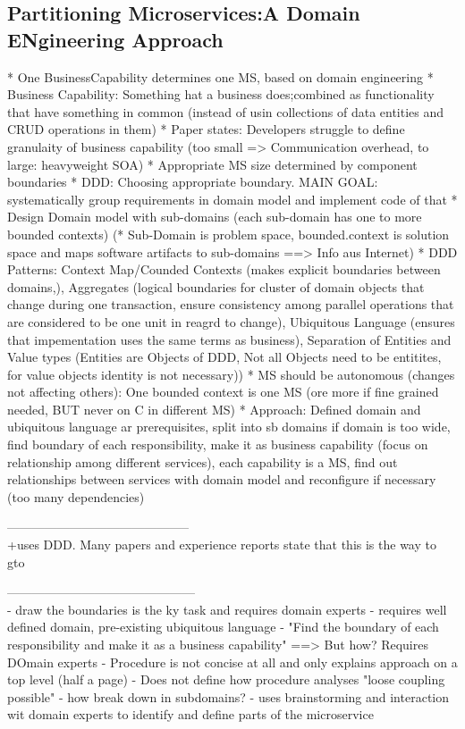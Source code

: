 \subsection{Partitioning Microservices:A Domain ENgineering Approach}

* One BusinessCapability determines one MS, based on domain engineering
* Business Capability: Something hat a business does;combined as functionality that have something in common (instead of usin collections of data entities and CRUD operations in them)
* Paper states: Developers struggle to define granulaity of business capability (too small => Communication overhead, to large: heavyweight SOA)
* Appropriate MS size determined by component boundaries
* DDD: Choosing appropriate boundary. MAIN GOAL: systematically group requirements in domain model and implement code  of that
* Design Domain model with sub-domains (each sub-domain has one to more bounded contexts)
(* Sub-Domain is problem space, bounded.context is solution space and maps software artifacts to sub-domains ==> Info aus Internet)
* DDD Patterns: Context Map/Counded Contexts (makes explicit boundaries between domains,), Aggregates (logical boundaries for cluster of domain objects that change during one transaction, ensure consistency among parallel operations that are considered to be one unit in reagrd to change), Ubiquitous Language (ensures that impementation uses the same terms as business), Separation of Entities and Value types (Entities are Objects of DDD, Not all Objects need to be entitites, for value objects identity is not necessary))
* MS should be autonomous (changes not affecting others): One bounded context is one MS (ore more if fine grained needed, BUT never on C in different MS)
* Approach: Defined domain and ubiquitous language ar prerequisites, split into sb domains if domain is too wide, find boundary of each responsibility, make it as business capability (focus on relationship among different services), each capability is a MS, find out relationships between services with domain model and reconfigure if necessary (too many dependencies)


--------------------------------------------\\


+uses DDD. Many papers and experience reports state that this is the way to gto


---------------------------------------------\\

- draw the boundaries is the ky task and requires domain experts
- requires well defined domain, pre-existing ubiquitous language
- "Find the boundary of each responsibility and make it as a business capability" ==> But how? Requires DOmain experts
- Procedure is not concise at all and only explains approach on a top level (half a page)
- Does not define how procedure analyses "loose coupling possible"
- how break down in subdomains?
- uses brainstorming and interaction wit domain experts to identify and define parts of the microservice


